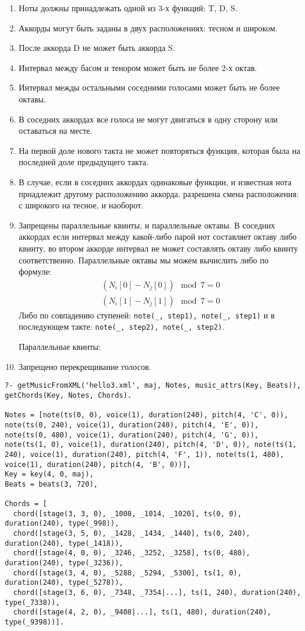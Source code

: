 \documentclass[12pt]{article}
\begin{document}
\begin{enumerate}
\item Ноты должны принадлежать одной из 3-х функций: T, D, S.
\item Аккорды могут быть заданы в двух расположениях: тесном и широком.
\item После аккорда D не может быть аккорда S.
\item Интервал между басом и тенором может быть не более 2-х октав.
\item Интервал межды остальными соседними голосами может быть не более октавы.
\item В соседних аккордах все голоса не могут двигаться в одну сторону или оставаться на месте.
\item На первой доле нового такта не может повторяться функция, которая была на последней доле предыдущего такта.
\item В случае, если в соседних аккордах одинаковые функции, и известная нота прнадлежит другому расположению аккорда, разрешена смена расположения: с широкого на тесное, и наоборот.
\item Запрещены параллельные квинты, и параллельные октавы. В соседних аккордах если интервал между какой-либо парой нот составляет октаву либо квинту, во втором аккорде интервал не может составлять октаву либо квинту соответственно.
  Параллельные октавы мы можем вычислить либо по формуле:
  \begin{equation}
    \begin{aligned}
      (N_i[0] - N_j[0]) \mod 7 = 0\\
      (N_i[1] - N_j[1]) \mod 7 = 0
    \end{aligned}
  \end{equation}
  Либо по совпадению ступеней: {\tt note(\_, step1), note(\_, step1)} и в последующем такте: {\tt note(\_, step2), note(\_, step2)}.

  Параллельные квинты:
\item Запрещено перекрещивание голосов.
\end{enumerate}
\begin{verbatim}
?- getMusicFromXML('hello3.xml', maj, Notes, music_attrs(Key, Beats)), getChords(Key, Notes, Chords).

Notes = [note(ts(0, 0), voice(1), duration(240), pitch(4, 'C', 0)), note(ts(0, 240), voice(1), duration(240), pitch(4, 'E', 0)), note(ts(0, 480), voice(1), duration(240), pitch(4, 'G', 0)), note(ts(1, 0), voice(1), duration(240), pitch(4, 'D', 0)), note(ts(1, 240), voice(1), duration(240), pitch(4, 'F', 1)), note(ts(1, 480), voice(1), duration(240), pitch(4, 'B', 0))],
Key = key(4, 0, maj),
Beats = beats(3, 720),

Chords = [
  chord([stage(3, 3, 0), _1008, _1014, _1020], ts(0, 0), duration(240), type(_998)),
  chord([stage(3, 5, 0), _1428, _1434, _1440], ts(0, 240), duration(240), type(_1418)),
  chord([stage(4, 0, 0), _3246, _3252, _3258], ts(0, 480), duration(240), type(_3236)),
  chord([stage(3, 4, 0), _5288, _5294, _5300], ts(1, 0), duration(240), type(_5278)),
  chord([stage(3, 6, 0), _7348, _7354|...], ts(1, 240), duration(240), type(_7338)),
  chord([stage(4, 2, 0), _9408|...], ts(1, 480), duration(240), type(_9398))].
\end{verbatim}
\end{document}

